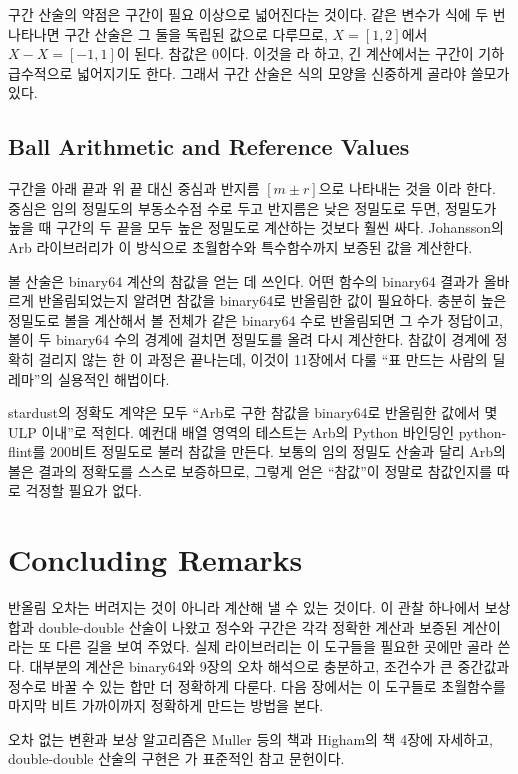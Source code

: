 구간 산술의 약점은 구간이 필요 이상으로 넓어진다는 것이다. 같은 변수가 식에 두 번 나타나면 구간 산술은 그 둘을 독립된 값으로 다루므로, $X=[1,2]$에서 $X-X=[-1,1]$이 된다. 참값은 $0$이다. 이것을 라 하고, 긴 계산에서는 구간이 기하급수적으로 넓어지기도 한다. 그래서 구간 산술은 식의 모양을 신중하게 골라야 쓸모가 있다.

\subsection{Ball Arithmetic and Reference Values}

구간을 아래 끝과 위 끝 대신 중심과 반지름 $[m\pm r]$으로 나타내는 것을 이라 한다. 중심은 임의 정밀도의 부동소수점 수로 두고 반지름은 낮은 정밀도로 두면, 정밀도가 높을 때 구간의 두 끝을 모두 높은 정밀도로 계산하는 것보다 훨씬 싸다. Johansson의 Arb 라이브러리가 이 방식으로 초월함수와 특수함수까지 보증된 값을 계산한다\cite{johansson2017arb}.

볼 산술은 binary64 계산의 참값을 얻는 데 쓰인다. 어떤 함수의 binary64 결과가 올바르게 반올림되었는지 알려면 참값을 binary64로 반올림한 값이 필요하다. 충분히 높은 정밀도로 볼을 계산해서 볼 전체가 같은 binary64 수로 반올림되면 그 수가 정답이고, 볼이 두 binary64 수의 경계에 걸치면 정밀도를 올려 다시 계산한다. 참값이 경계에 정확히 걸리지 않는 한 이 과정은 끝나는데, 이것이 11장에서 다룰 ``표 만드는 사람의 딜레마''의 실용적인 해법이다.

\begin{instardust}
stardust의 정확도 계약은 모두 ``Arb로 구한 참값을 binary64로 반올림한 값에서 몇 ULP 이내''로 적힌다. 예컨대 배열 영역의 테스트는 Arb의 Python 바인딩인 python-flint를 $200$비트 정밀도로 불러 참값을 만든다. 보통의 임의 정밀도 산술과 달리 Arb의 볼은 결과의 정확도를 스스로 보증하므로, 그렇게 얻은 ``참값''이 정말로 참값인지를 따로 걱정할 필요가 없다.
\end{instardust}

\section{Concluding Remarks}

반올림 오차는 버려지는 것이 아니라 계산해 낼 수 있는 것이다. 이 관찰 하나에서 보상 합과 double-double 산술이 나왔고 정수와 구간은 각각 정확한 계산과 보증된 계산이라는 또 다른 길을 보여 주었다. 실제 라이브러리는 이 도구들을 필요한 곳에만 골라 쓴다. 대부분의 계산은 binary64와 9장의 오차 해석으로 충분하고, 조건수가 큰 중간값과 정수로 바꿀 수 있는 합만 더 정확하게 다룬다. 다음 장에서는 이 도구들로 초월함수를 마지막 비트 가까이까지 정확하게 만드는 방법을 본다.

오차 없는 변환과 보상 알고리즘은 Muller 등의 책\cite{muller2018handbook}과 Higham의 책\cite{higham2002accuracy} 4장에 자세하고, double-double 산술의 구현은 \cite{hida2001qd}가 표준적인 참고 문헌이다.

\chapterreferences
